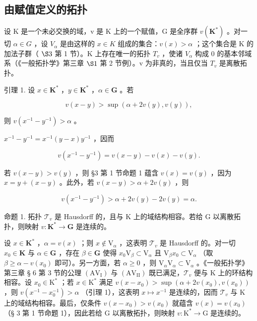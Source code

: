 \subsection{由赋值定义的拓扑}

设 K 是一个未必交换的域，v 是 K 上的一个赋值，G 是全序群 \(v(\mathbf{K}^{*})\) 。对一切 \(\alpha \in G\) ，设 \(V_{\alpha}\) 是由这样的 \(x \in K\) 组成的集合：\(v(x) > \alpha\) ；这个集合是 K 的加法子群（ \(\S 3\) 第 1 节）。K 上存在唯一的拓扑 \(T_{v}\) ，使诸 \(V_{\alpha}\) 构成 0 的基本邻域系（《一般拓扑学》第三章 \(\S 1\) 第 2 节例）。v 为非真的，当且仅当 \(T_{v}\) 是离散拓扑。

引理 1. 设 \(x \in \mathbf{K}^*\) ，\(y \in \mathbf{K}^*\) ，\(\alpha \in \mathbf{G}\) 。若

\[
v (x - y) > \sup (\alpha + 2 v (y), v (y)),
\]

则 \(v(x^{-1} - y^{-1}) > \alpha\) 。

\(x^{-1} - y^{-1} = x^{-1}(y - x)y^{-1}\) ，因而

\[
v (x ^ {- 1} - y ^ {- 1}) = v (x - y) - v (x) - v (y).
\]

若 \(v(x - y) > v(y)\) ，则 §3 第 1 节命题 1 蕴含 \(v(x) = v(y)\) ，因为 \(x = y + (x - y)\) 。此外，若 \(v(x - y) > \alpha + 2v(y)\) ，则

\[
v (x ^ {- 1} - y ^ {- 1}) > \alpha + 2 v (y) - 2 v (y) = \alpha .
\]

命题 1. 拓扑 \(\mathcal{T}_{v}\) 是 Hausdorff 的，且与 K 上的域结构相容。若给 G 以离散拓扑，则映射 \(v: \mathbf{K}^{*} \to \mathbf{G}\) 是连续的。

设 \(x \in \mathbf{K}^*\) ，\(\alpha = v(x)\) ；则 \(x \notin \mathrm{V}_{\alpha}\) ，这表明 \(\mathcal{T}_v\) 是 Hausdorff 的。对一切 \(x_0 \in \mathbf{K}\) 与 \(\alpha \in \mathbf{G}\) ，存在 \(\beta \in \mathbf{G}\) 使得 \(x_0\mathrm{V}_{\beta} \subset \mathrm{V}_{\alpha}\) 且 \(\mathrm{V}_{\beta}x_0 \subset \mathrm{V}_{\alpha}\) （取 \(\beta \geqslant \alpha - v(x_0)\) 即可）。另一方面，若 \(\alpha \geqslant 0\) ，则 \(\mathrm{V}_{\alpha}\mathrm{V}_{\alpha} \subset \mathrm{V}_{\alpha}\) 。《一般拓扑学》第三章 § 6 第 3 节的公理 \((\mathrm{AV}_{\mathrm{I}})\) 与 \((\mathrm{AV}_{\mathrm{II}})\) 既已满足，\(\mathcal{T}_{v}\) 便与 K 上的环结构相容。设 \(x_{0} \in \mathrm{K}^{*}\) ；若 \(x \in \mathrm{K}^{*}\) 满足 \(v(x - x_{0}) > \sup (\alpha + 2v(x_{0}), v(x_{0}))\) ，则 \(v(x^{-1} - x_{0}^{-1}) > \alpha\) （引理 1），这表明 \(x \mapsto x^{-1}\) 是连续的，因而 \(\mathcal{T}_{v}\) 与 K 上的域结构相容。最后，仅条件 \(v(x - x_{0}) > v(x_{0})\) 就蕴含 \(v(x) = v(x_{0})\) （§ 3 第 1 节命题 1），因此若给 G 以离散拓扑，则映射 \(v: \mathrm{K}^{*} \to \mathrm{G}\) 是连续的。

